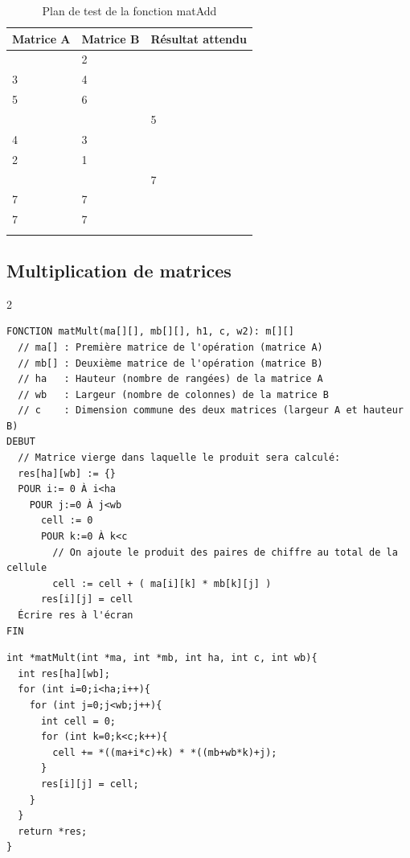 \documentclass[a11paper, 11pt]{article}
\begin{document}
\begin{table}[H]
  \centering
  \caption{Plan de test de la fonction matAdd}
  \label{tab-tests}
  \begin{tabular}{p{2.5cm}p{2.5cm}p{3cm}}
    \toprule
    Matrice A & Matrice B & Résultat attendu \\
    \midrule
    \[
    \left[ {\begin{array}{cc}
    {1} & {2} \\
    {3} & {4} \\
    {5} & {6} \\
            \end{array} } \right]
    \] & \[
    \left[ {\begin{array}{cc}
    {6} & {5} \\
    {4} & {3} \\
    {2} & {1} \\
            \end{array} } \right]
    \] & \[
    \left[ {\begin{array}{cc}
    {7} & {7} \\
    {7} & {7} \\
    {7} & {7} \\
            \end{array} } \right]
    \] \\
    \bottomrule
  \end{tabular}
\end{table}


\newpage
\subsection{Multiplication de matrices}

\begin{multicols}{2}
\begin{lstlisting}[caption=Pseudocode de la fonction matMult]
FONCTION matMult(ma[][], mb[][], h1, c, w2): m[][]
  // ma[] : Première matrice de l'opération (matrice A)
  // mb[] : Deuxième matrice de l'opération (matrice B)
  // ha   : Hauteur (nombre de rangées) de la matrice A
  // wb   : Largeur (nombre de colonnes) de la matrice B
  // c    : Dimension commune des deux matrices (largeur A et hauteur B)
DEBUT
  // Matrice vierge dans laquelle le produit sera calculé:
  res[ha][wb] := {}
  POUR i:= 0 À i<ha
    POUR j:=0 À j<wb
      cell := 0
      POUR k:=0 À k<c
        // On ajoute le produit des paires de chiffre au total de la cellule
        cell := cell + ( ma[i][k] * mb[k][j] )
      res[i][j] = cell
  Écrire res à l'écran
FIN
\end{lstlisting}
\columnbreak
\begin{lstlisting}[caption=Fonction matMult écrite en C]
int *matMult(int *ma, int *mb, int ha, int c, int wb){
  int res[ha][wb];
  for (int i=0;i<ha;i++){
    for (int j=0;j<wb;j++){
      int cell = 0;
      for (int k=0;k<c;k++){
        cell += *((ma+i*c)+k) * *((mb+wb*k)+j);
      }
      res[i][j] = cell;
    }
  }
  return *res;
}
\end{lstlisting}

\end{multicols}
\end{document}
